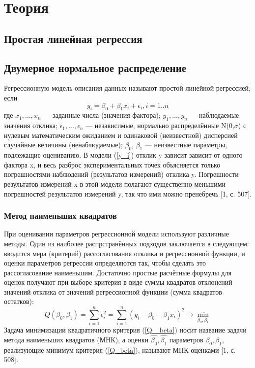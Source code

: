\documentclass[12pt,a4paper]{scrartcl}
\begin{document}
\section{Теория}

\subsection{Простая линейная регрессия}

\subsection{Двумерное нормальное распределение}
    Регрессионную модель описания данных называют простой линейной регрессией, если
	\begin{equation}
	    y_{i} = \beta_{0} + \beta_{1}x_{i} + \epsilon_{i},  i = 1..n
	    \label{y_i}
	\end{equation}
	где $x_{1},...,x_{n}$ — заданные числа (значения фактора); $y_{1},...,y_{n}$ — наблюдаемые значения отклика; $\epsilon_{1},...,\epsilon_{n}$ — независимые, нормально распределённые N(0,$\sigma$) с нулевым математическим ожиданием и одинаковой (неизвестной) дисперсией случайные величины (ненаблюдаемые); $\beta_{0}$, $\beta_{1}$ — неизвестные параметры, подлежащие оцениванию.
    В модели (\ref{y_i}) отклик y зависит зависит от одного фактора x, и весь разброс экспериментальных точек объясняется только погрешностями наблюдений (результатов измерений) отклика y. Погрешности результатов измерений x в этой модели полагают существенно меньшими погрешностей результатов измерений y, так что ими можно пренебречь [1, с. 507].


	
	\subsubsection{Метод наименьших квадратов}
	При оценивании параметров регрессионной модели используют различные методы. Один из наиболее распрстранённых подходов заключается в следующем: вводится мера (критерий) рассогласования отклика и регрессионной функции, и оценки параметров регрессии определяются так, чтобы сделать это рассогласование наименьшим. Достаточно простые расчётные формулы для оценок получают при выборе критерия в виде суммы квадратов отклонений значений отклика от значений регрессионной функции (сумма квадратов остатков):
	\begin{equation}
	    Q(\beta_{0}, \beta_{1}) = \sum_{i=1}^{n}{\epsilon_{i}^{2}} = 
	    \sum_{i=1}^{n}{(y_{i} - \beta_{0} - \beta_{1}x_{i})^{2}}\rightarrow \min_{\beta_{0}, \beta_{1}}
	    \label{Q_beta}
	\end{equation}
	Задача минимизации квадратичного критерия (\ref{Q_
beta}) носит название задачи метода наименьших квадратов (МНК), а оценки $\hat{\beta_{0}}, \hat{\beta_{1}}$ параметров $\beta_{0}, \beta_{1}$, реализующие минимум критерия (\ref{Q_beta}), называют МНК-оценками [1, с. 508]. 
\end{document}
